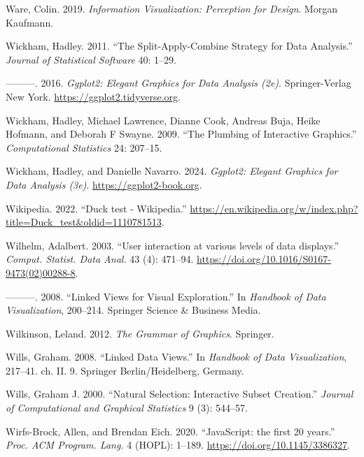 \documentclass[
]{book}
\newlength{\cslhangindent}
\newenvironment{CSLReferences}[2] %
 {\begin{list}{}{%
  \setlength{\itemindent}{0pt}
  \setlength{\leftmargin}{0pt}
  \setlength{\parsep}{0pt}
  \ifodd #1
   \setlength{\leftmargin}{\cslhangindent}
   \setlength{\itemindent}{-1\cslhangindent}
  \fi
  \setlength{\itemsep}{#2\baselineskip}}}
 {\end{list}}
\begin{document}
\begin{CSLReferences}{1}{0}
Ware, Colin. 2019. \emph{Information Visualization: Perception for Design}. Morgan Kaufmann.

Wickham, Hadley. 2011. {``The Split-Apply-Combine Strategy for Data Analysis.''} \emph{Journal of Statistical Software} 40: 1--29.

---------. 2016. \emph{Ggplot2: Elegant Graphics for Data Analysis (2e)}. Springer-Verlag New York. \url{https://ggplot2.tidyverse.org}.

Wickham, Hadley, Michael Lawrence, Dianne Cook, Andreas Buja, Heike Hofmann, and Deborah F Swayne. 2009. {``The Plumbing of Interactive Graphics.''} \emph{Computational Statistics} 24: 207--15.

Wickham, Hadley, and Danielle Navarro. 2024. \emph{Ggplot2: Elegant Graphics for Data Analysis (3e)}. \url{https://ggplot2-book.org}.

Wikipedia. 2022. {``{Duck test - Wikipedia}.''} \url{https://en.wikipedia.org/w/index.php?title=Duck_test&oldid=1110781513}.

Wilhelm, Adalbert. 2003. {``{User interaction at various levels of data displays}.''} \emph{Comput. Statist. Data Anal.} 43 (4): 471--94. \url{https://doi.org/10.1016/S0167-9473(02)00288-8}.

---------. 2008. {``Linked Views for Visual Exploration.''} In \emph{Handbook of Data Visualization}, 200--214. Springer Science \& Business Media.

Wilkinson, Leland. 2012. \emph{The Grammar of Graphics}. Springer.

Wills, Graham. 2008. {``Linked Data Views.''} In \emph{Handbook of Data Visualization}, 217--41. ch. II. 9. Springer Berlin/Heidelberg, Germany.

Wills, Graham J. 2000. {``Natural Selection: Interactive Subset Creation.''} \emph{Journal of Computational and Graphical Statistics} 9 (3): 544--57.

Wirfs-Brock, Allen, and Brendan Eich. 2020. {``{JavaScript: the first 20 years}.''} \emph{Proc. ACM Program. Lang.} 4 (HOPL): 1--189. \url{https://doi.org/10.1145/3386327}.


\end{CSLReferences}
\end{document}
